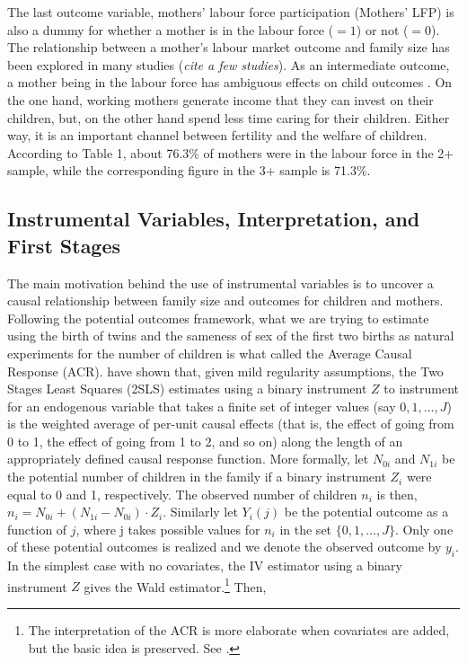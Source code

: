 The last outcome variable, mothers' labour force participation (Mothers' LFP) is also a dummy for whether a mother is in the labour force ($ =1 $) or not ($ =0 $). The relationship between a mother's labour market outcome and family size has been explored in many studies (\textit{cite a few studies}). As an intermediate outcome, a mother being in the labour force has ambiguous effects on child outcomes \parencite{caceres-delpiano_impacts_2006}. On the one hand, working mothers generate income that they can invest on their children, but, on the other hand spend less time caring for their children. Either way, it is an important channel between fertility and the welfare of children. According to Table 1, about 76.3\% of mothers were in the labour force in the 2+ sample, while the corresponding figure in the 3+ sample is 71.3\%.


\subsection{Instrumental Variables, Interpretation, and First Stages}

The main motivation behind the use of instrumental variables is to uncover a causal relationship between family size and outcomes for children and mothers. Following the potential outcomes framework, what we are trying to estimate using the birth of twins and the sameness of sex of the first two births as natural experiments for the number of children is what \textcite{Angrist1995} called the Average Causal Response (ACR). \textcite{Angrist1995} have shown that, given mild regularity assumptions, the Two Stages Least Squares (2SLS) estimates using a binary instrument $ Z $ to instrument for an endogenous variable that takes a finite set of integer values  (say $ 0, 1, \dots, J $) is the weighted average of per-unit causal effects (that is, the effect of going from 0 to 1, the effect of going from 1 to 2, and so on) along the length of an appropriately defined causal response function. More formally, let $ N_{0i} $ and $ N_{1i} $ be the potential number of children in the family if a binary instrument $ Z_{i} $ were equal to 0 and 1, respectively. The observed number of children $ n_{i} $ is then, $ n_{i} = N_{0i} + (N_{1i} - N_{0i})\cdot Z_{i} $. Similarly let $ Y_{i}(j) $ be the potential outcome as a function of $ j $, where j takes possible values for $ n_{i} $ in the set $ \{0, 1, \dots, J\} $. Only one of these potential outcomes is realized and we denote the observed outcome by $ y_{i} $. In the simplest case with no covariates, the IV estimator using a binary instrument $ Z $ gives the Wald estimator.\footnote{The interpretation of the ACR is more elaborate when covariates are added, but the basic idea is preserved. See \textcite[p.~437]{Angrist1995}.} Then,



